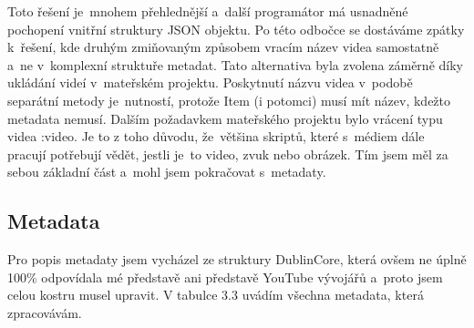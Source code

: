 \par Toto řešení je~mnohem přehlednější a~další programátor má usnadněné pochopení vnitřní struktury JSON objektu. Po této odbočce se dostáváme zpátky k~řešení, kde druhým zmiňovaným způsobem vracím název videa samostatně a~ne v~komplexní struktuře metadat. Tato alternativa byla zvolena záměrně díky ukládání videí v~mateřském projektu. Poskytnutí názvu videa v~podobě separátní metody je~nutností, protože Item (i potomci) musí mít název, kdežto metadata nemusí. Dalším požadavkem mateřského projektu bylo vrácení typu videa :video. Je to z toho důvodu, že~většina skriptů, které s~médiem dále pracují potřebují vědět, jestli je~to video, zvuk nebo obrázek. Tím jsem měl za sebou základní část a~mohl jsem pokračovat s~metadaty.

\subsection{Metadata}

\par Pro popis metadaty jsem vycházel ze struktury DublinCore, která ovšem ne úplně 100\% odpovídala mé představě ani představě YouTube vývojářů a~proto jsem celou kostru musel upravit. V tabulce 3.3 uvádím všechna metadata, která zpracovávám.

